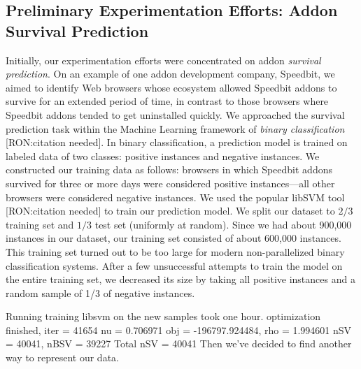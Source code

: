 \documentclass[11pt,oneside]{book}
\let\Oldsubsection\subsection
\renewcommand{\subsection}{\FloatBarrier\Oldsubsection}
\begin{document}

\subsection{Preliminary Experimentation Efforts: Addon Survival Prediction}
Initially, our experimentation efforts were concentrated on addon \emph{survival prediction}. On an example of one addon development company, Speedbit, we aimed to identify Web browsers whose ecosystem allowed Speedbit addons to survive for an extended period of time, in contrast to those browsers where Speedbit addons tended to get uninstalled quickly. We approached the survival prediction task within the Machine Learning framework of \emph{binary classification} [RON:citation needed]. In binary classification, a prediction model is trained on labeled data of two classes: positive instances and negative instances. We constructed our training data as follows: browsers in which Speedbit addons survived for three or more days were considered positive instances---all other browsers were considered negative instances. We used the popular libSVM tool [RON:citation needed] to train our prediction model.
We split our dataset to $2/3$ training set and $1/3$ test set (uniformly at random). Since we had about 900,000 instances in our dataset, our training set consisted of about 600,000 instances. This training set turned out to be too large for modern non-parallelized binary classification systems. After a few unsuccessful attempts to train the model on the entire training set, we decreased its size by taking all positive instances and a random sample of 1/3 of negative instances.

\iffalse
Running training libsvm on the new samples took one hour.
optimization finished, iter = 41654
nu = 0.706971
obj = -196797.924484, rho = 1.994601
nSV = 40041, nBSV = 39227
Total nSV = 40041
Then we've decided to find another way to represent our data.
\end{document}
